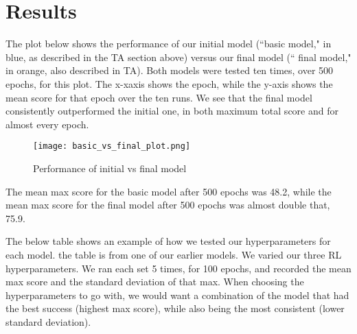 \documentclass[11pt]{article}
\begin{document}
\section{Results}

The plot below shows the performance of our initial model (``basic model," in blue, as described in the TA section above) versus our final model (`` final model," in orange, also described in TA). Both models were tested ten times, over 500 epochs, for this plot. The x-xaxis shows the epoch, while the y-axis shows the mean score for that epoch over the ten runs. We see that the final model consistently outperformed the initial one, in both maximum total score and for almost every epoch.



\begin{figure}[!htbp]
\begin{center}
\texttt{[image: basic\_vs\_final\_plot.png]}  
\caption{Performance of initial vs final model} 
\end{center}
\end{figure}

The mean max score for the basic model after 500 epochs was 48.2, while the mean max score for the final model after 500 epochs was almost double that, 75.9. 


The below table shows an example of how we tested our hyperparameters for each model. the table is from one of our earlier models. We varied our three RL hyperparameters. We ran each set 5 times, for 100 epochs, and recorded the mean max score and the standard deviation of that max. When choosing the hyperparameters to go with, we would want a combination of the model that had the best success (highest max score), while also being the most consistent (lower standard deviation).
\end{document}
